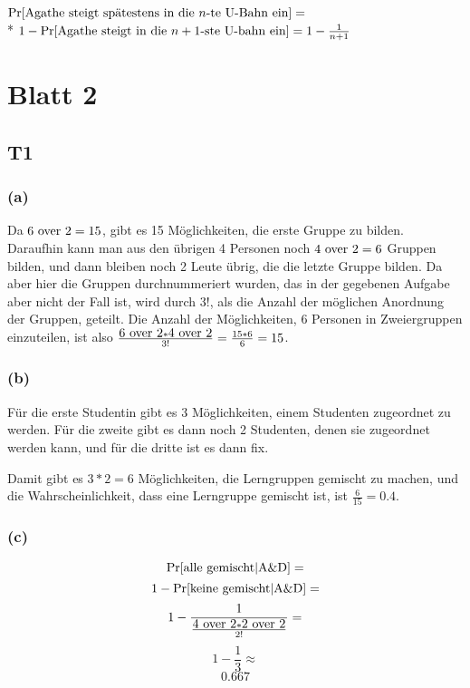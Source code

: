 \documentclass{article}
\begin{document}
$ \Pr[\hbox{Agathe steigt spätestens in die $n$-te U-Bahn ein}]=$\\*
$ 1-\Pr[\hbox{Agathe steigt in die $n+1$-ste U-bahn ein}]=1-\frac{1}{n+1} $

\section*{Blatt 2}

\subsection*{T1}

\subsubsection*{(a)}

Da $\hbox{6 over 2}=15$, gibt es 15 Möglichkeiten, die erste Gruppe
zu bilden. Daraufhin kann man aus den übrigen 4 Personen noch $\hbox{4
over 2}=6$ Gruppen bilden, und dann bleiben noch 2 Leute übrig, die die
letzte Gruppe bilden. Da aber hier die Gruppen durchnummeriert wurden,
das in der gegebenen Aufgabe aber nicht der Fall ist, wird durch $3!$,
als die Anzahl der möglichen Anordnung der Gruppen, geteilt.  Die Anzahl
der Möglichkeiten, 6 Personen in Zweiergruppen einzuteilen, ist also
$\frac{\hbox{6 over 2}*\hbox{4 over 2}}{3!}=\frac{15*6}{6}=15$.

\subsubsection*{(b)}

Für die erste Studentin gibt es 3 Möglichkeiten, einem Studenten
zugeordnet zu werden. Für die zweite gibt es dann noch 2 Studenten,
denen sie zugeordnet werden kann, und für die dritte ist es dann fix.

Damit gibt es $3*2=6$ Möglichkeiten, die Lerngruppen gemischt zu machen,
und die Wahrscheinlichkeit, dass eine Lerngruppe gemischt ist, ist
$\frac{6}{15}=0.4$.

\subsubsection*{(c)}

$$\Pr[\hbox{alle gemischt}|\hbox{A\&D}]=$$
$$1-\Pr[\hbox{keine gemischt}|\hbox{A\&D}]=$$
$$1-\frac{1}{\frac{\hbox{4 over 2}*\hbox{2 over 2}}{2!}}=$$
$$1-\frac{1}{3}\approx$$
$$0.667$$
\end{document}
